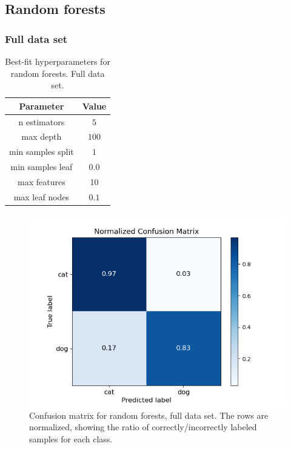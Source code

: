 \documentclass[a4paper]{article}
\begin{document}
\subsection{Random forests}
\subsubsection{Full data set}
\begin{table}[H]
  \centering
  \caption{Best-fit hyperparameters for random forests. Full data set.}
  \label{tab:best_fit_rf_nonpca}
  \begin{tabular}{c|c}
    \hline\hline
    Parameter & Value\\\hline
    n estimators &  $5$\\
    max depth &  $100$\\
    min samples split & $1$ \\
    min samples leaf  & $0.0$\\
    max features & 10 \\
    max leaf nodes & $0.1$
    \end{tabular}
\end{table}

\begin{figure}[H]
	\centering
	\includegraphics[scale=0.6]{../figures/random_forest/confusion_matrix_nbins200_pca0_seed4155_ts0.20.png}
	\caption{Confusion matrix for random forests, full data set. The rows are normalized, showing the ratio of correctly/incorrectly labeled samples for each class.}
	\label{fig:rf_confusion_nonpca}
\end{figure}	
\end{document}
